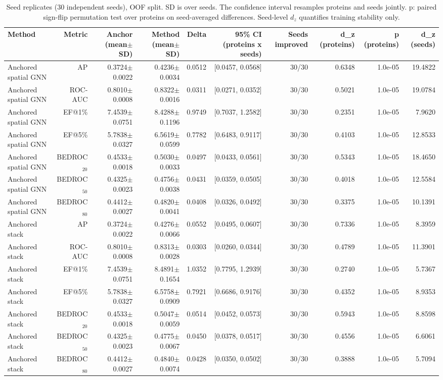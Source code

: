 \begin{table}[t]
\centering
\small
\caption{Seed replicates (30 independent seeds), OOF split. SD is over seeds. The confidence interval resamples proteins and seeds jointly. p: paired sign-flip permutation test over proteins on seed-averaged differences. Seed-level $d_z$ quantifies training stability only.}
\label{tab:table_replicates_oof}
\begin{tabular}{lrrrrrrrrr}
\toprule
Method & Metric & Anchor (mean$\pm$SD) & Method (mean$\pm$SD) & Delta & 95\% CI (proteins x seeds) & Seeds improved & d\_z (proteins) & p (proteins) & d\_z (seeds) \\
\midrule
Anchored spatial GNN & AP & 0.3724$\pm$0.0022 & 0.4236$\pm$0.0034 & 0.0512 & [0.0457, 0.0568] & 30/30 & 0.6348 & 1.0e-05 & 19.4822 \\
Anchored spatial GNN & ROC-AUC & 0.8010$\pm$0.0008 & 0.8322$\pm$0.0016 & 0.0311 & [0.0271, 0.0352] & 30/30 & 0.5021 & 1.0e-05 & 19.0784 \\
Anchored spatial GNN & EF@1\% & 7.4539$\pm$0.0751 & 8.4288$\pm$0.1196 & 0.9749 & [0.7037, 1.2582] & 30/30 & 0.2351 & 1.0e-05 & 7.9620 \\
Anchored spatial GNN & EF@5\% & 5.7838$\pm$0.0327 & 6.5619$\pm$0.0599 & 0.7782 & [0.6483, 0.9117] & 30/30 & 0.4103 & 1.0e-05 & 12.8533 \\
Anchored spatial GNN & BEDROC$_{20}$ & 0.4533$\pm$0.0018 & 0.5030$\pm$0.0033 & 0.0497 & [0.0433, 0.0561] & 30/30 & 0.5343 & 1.0e-05 & 18.4650 \\
Anchored spatial GNN & BEDROC$_{50}$ & 0.4325$\pm$0.0023 & 0.4756$\pm$0.0038 & 0.0431 & [0.0359, 0.0505] & 30/30 & 0.4018 & 1.0e-05 & 12.5584 \\
Anchored spatial GNN & BEDROC$_{80}$ & 0.4412$\pm$0.0027 & 0.4820$\pm$0.0041 & 0.0408 & [0.0326, 0.0492] & 30/30 & 0.3375 & 1.0e-05 & 10.1391 \\
Anchored stack & AP & 0.3724$\pm$0.0022 & 0.4276$\pm$0.0066 & 0.0552 & [0.0495, 0.0607] & 30/30 & 0.7336 & 1.0e-05 & 8.3959 \\
Anchored stack & ROC-AUC & 0.8010$\pm$0.0008 & 0.8313$\pm$0.0028 & 0.0303 & [0.0260, 0.0344] & 30/30 & 0.4789 & 1.0e-05 & 11.3901 \\
Anchored stack & EF@1\% & 7.4539$\pm$0.0751 & 8.4891$\pm$0.1654 & 1.0352 & [0.7795, 1.2939] & 30/30 & 0.2740 & 1.0e-05 & 5.7367 \\
Anchored stack & EF@5\% & 5.7838$\pm$0.0327 & 6.5758$\pm$0.0909 & 0.7921 & [0.6686, 0.9176] & 30/30 & 0.4352 & 1.0e-05 & 8.9353 \\
Anchored stack & BEDROC$_{20}$ & 0.4533$\pm$0.0018 & 0.5047$\pm$0.0059 & 0.0514 & [0.0452, 0.0573] & 30/30 & 0.5943 & 1.0e-05 & 8.8598 \\
Anchored stack & BEDROC$_{50}$ & 0.4325$\pm$0.0023 & 0.4775$\pm$0.0067 & 0.0450 & [0.0378, 0.0517] & 30/30 & 0.4556 & 1.0e-05 & 6.6061 \\
Anchored stack & BEDROC$_{80}$ & 0.4412$\pm$0.0027 & 0.4840$\pm$0.0074 & 0.0428 & [0.0350, 0.0502] & 30/30 & 0.3888 & 1.0e-05 & 5.7094 \\
\bottomrule
\end{tabular}
\end{table}
